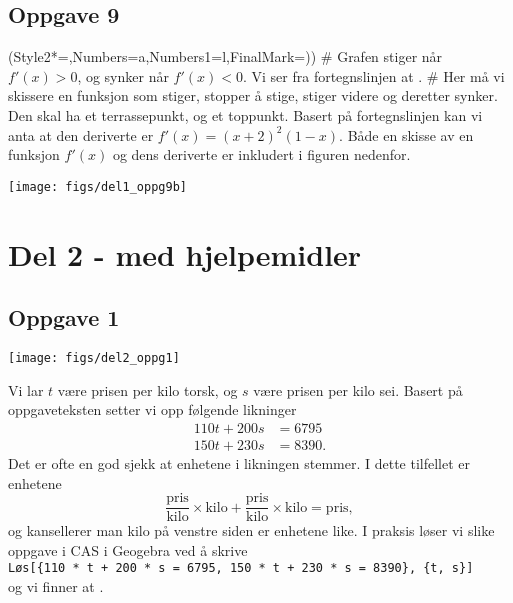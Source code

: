 \subsection*{Oppgave 9}
\begin{easylist}[enumerate]
	\ListProperties(Style2*=,Numbers=a,Numbers1=l,FinalMark={)})
	# Grafen stiger når $f'(x) > 0$, og synker når $f'(x) < 0$.
	Vi ser fra fortegnslinjen at .
	# Her må vi skissere en funksjon som stiger, stopper å stige, stiger videre og deretter synker. 
	Den skal ha et terrassepunkt, og et toppunkt.
	Basert på fortegnslinjen kan vi anta at den deriverte er $f'(x) = (x+2)^2 (1-x)$. Både en skisse av en funksjon $f'(x)$ og dens deriverte er inkludert i figuren nedenfor.
	\begin{center}
		\texttt{[image: figs/del1\_oppg9b]}
	\end{center}
\end{easylist}



\section*{Del 2 - med hjelpemidler}


\subsection*{Oppgave 1}
\begin{center}
	\texttt{[image: figs/del2\_oppg1]}
\end{center}
Vi lar $t$ være prisen per kilo torsk, og $s$ være prisen per kilo sei.
Basert på oppgaveteksten setter vi opp følgende likninger
\begin{align*}
	110t + 200 s &= 6795\\
	150t + 230 s &= 8390.
\end{align*}
Det er ofte en god sjekk at enhetene i likningen stemmer. I dette tilfellet er enhetene
\begin{equation*}
	\frac{\text{pris}}{\text{kilo}} \times \text{kilo} +
	\frac{\text{pris}}{\text{kilo}} \times \text{kilo} =  \text{pris},
\end{equation*}
og kansellerer man kilo på venstre siden er enhetene like.
I praksis løser vi slike oppgave i CAS i Geogebra ved å skrive \\
\verb|Løs[{110 * t + 200 * s = 6795, 150 * t + 230 * s = 8390}, {t, s}]| \\
og vi finner at .

